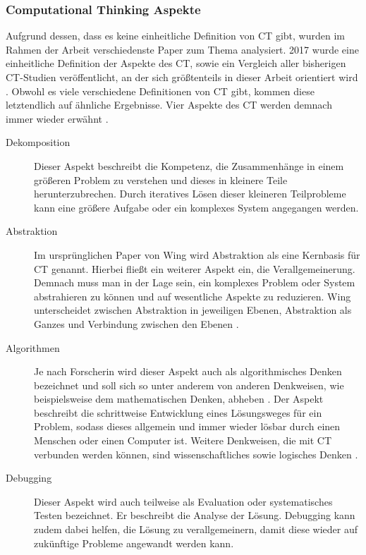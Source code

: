 \subsubsection{Computational Thinking Aspekte}
Aufgrund dessen, dass es keine einheitliche Definition von CT gibt, wurden im Rahmen der Arbeit verschiedenste Paper zum Thema analysiert. 2017 wurde eine einheitliche Definition der Aspekte des CT, sowie ein Vergleich aller bisherigen CT-Studien veröffentlicht, an der sich größtenteils in dieser Arbeit orientiert wird \cite{schute}.
Obwohl es viele verschiedene Definitionen von CT gibt, kommen diese letztendlich auf ähnliche Ergebnisse. Vier Aspekte des CT werden demnach immer wieder erwähnt \cite{schute}.

\begin{description}
    \item[Dekomposition] Dieser Aspekt beschreibt die Kompetenz, die Zusammenhänge in einem größeren Problem zu verstehen und dieses in kleinere Teile herunterzubrechen. Durch iteratives Lösen dieser kleineren Teilprobleme kann eine größere Aufgabe oder ein komplexes System angegangen werden.
    \item[Abstraktion] Im ursprünglichen Paper von Wing \cite{wing2006} wird Abstraktion als eine Kernbasis für CT genannt. Hierbei fließt ein weiterer Aspekt ein, die Verallgemeinerung.
    Demnach muss man in der Lage sein, ein komplexes Problem oder System abstrahieren zu können und auf wesentliche Aspekte zu reduzieren. Wing unterscheidet zwischen Abstraktion in jeweiligen Ebenen, Abstraktion als Ganzes und Verbindung zwischen den Ebenen \cite{wing2008}.
    \item[Algorithmen] Je nach Forscherin wird dieser Aspekt auch als algorithmisches Denken bezeichnet und soll sich so unter anderem von anderen Denkweisen, wie beispielsweise dem mathematischen Denken, abheben \cite{schute}. Der Aspekt beschreibt die schrittweise Entwicklung eines Lösungsweges für ein Problem, sodass dieses allgemein und immer wieder lösbar durch einen Menschen oder einen Computer ist. Weitere Denkweisen, die mit CT verbunden werden können, sind wissenschaftliches sowie logisches Denken \cite{curzon}.
    \item[Debugging] Dieser Aspekt wird auch teilweise als Evaluation \cite{curzon} oder systematisches Testen \cite{wing2006} bezeichnet. Er beschreibt die Analyse der Lösung. Debugging kann zudem dabei helfen, die Lösung zu verallgemeinern, damit diese wieder auf zukünftige Probleme angewandt werden kann.
\end{description}

